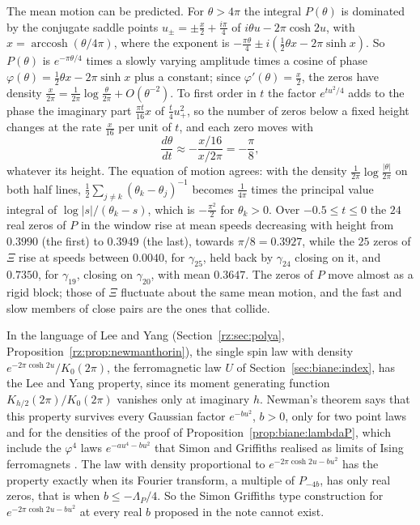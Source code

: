 The mean motion can be predicted. For $\theta>4\pi$ the integral $P(\theta)$ is dominated by the conjugate saddle points $u_\pm=\pm\frac x2+\frac{i\pi}4$ of $i\theta u-2\pi\cosh2u$, with $x=\operatorname{arccosh}(\theta/4\pi)$, where the exponent is $-\frac{\pi\theta}4\pm i(\frac12\theta x-2\pi\sinh x)$. So $P(\theta)$ is $e^{-\pi\theta/4}$ times a slowly varying amplitude times a cosine of phase $\varphi(\theta)=\frac12\theta x-2\pi\sinh x$ plus a constant; since $\varphi'(\theta)=\frac x2$, the zeros have density $\frac x{2\pi}=\frac1{2\pi}\log\frac\theta{2\pi}+O(\theta^{-2})$. To first order in $t$ the factor $e^{tu^2/4}$ adds to the phase the imaginary part $\frac{\pi t}{16}x$ of $\frac t4u_+^2$, so the number of zeros below a fixed height changes at the rate $\frac x{16}$ per unit of $t$, and each zero moves with
\[
\frac{d\theta}{dt}\approx-\frac{x/16}{x/2\pi}=-\frac\pi8,
\]
whatever its height. The equation of motion agrees: with the density $\frac1{2\pi}\log\frac{|\theta|}{2\pi}$ on both half lines, $\frac12\sum_{j\ne k}(\theta_k-\theta_j)^{-1}$ becomes $\frac1{4\pi}$ times the principal value integral of $\log|s|/(\theta_k-s)$, which is $-\frac{\pi^2}2$ for $\theta_k>0$. Over $-0.5\le t\le0$ the $24$ real zeros of $P$ in the window rise at mean speeds decreasing with height from $0.3990$ (the first) to $0.3949$ (the last), towards $\pi/8=0.3927$, while the $25$ zeros of $\Xi$ rise at speeds between $0.0040$, for $\gamma_{25}$, held back by $\gamma_{24}$ closing on it, and $0.7350$, for $\gamma_{19}$, closing on $\gamma_{20}$, with mean $0.3647$. The zeros of $P$ move almost as a rigid block; those of $\Xi$ fluctuate about the same mean motion, and the fast and slow members of close pairs are the ones that collide.

In the language of Lee and Yang \cite{LeeYang} (Section~\ref{rz:sec:polya}, Proposition~\ref{rz:prop:newmanthorin}), the single spin law with density $e^{-2\pi\cosh2u}/K_0(2\pi)$, the ferromagnetic law $U$ of Section~\ref{sec:biane:index}, has the Lee and Yang property, since its moment generating function $K_{h/2}(2\pi)/K_0(2\pi)$ vanishes only at imaginary $h$. Newman's theorem says that this property survives every Gaussian factor $e^{-bu^2}$, $b>0$, only for two point laws and for the densities of the proof of Proposition~\ref{prop:biane:lambdaP}, which include the $\varphi^4$ laws $e^{-au^4-bu^2}$ that Simon and Griffiths realised as limits of Ising ferromagnets \cite{SimonGriffiths73}. The law with density proportional to $e^{-2\pi\cosh2u-bu^2}$ has the property exactly when its Fourier transform, a multiple of $P_{-4b}$, has only real zeros, that is when $b\le-\Lambda_P/4$. So the Simon Griffiths type construction for $e^{-2\pi\cosh2u-bu^2}$ at every real $b$ proposed in the note cannot exist.

